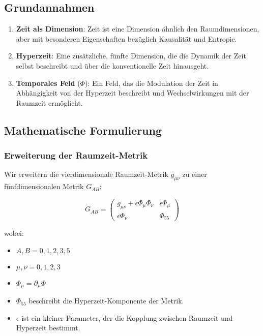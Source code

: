 \documentclass[11pt,a4paper]{article}
\begin{document}
\subsection{Grundannahmen}

\begin{enumerate}
    \item \textbf{Zeit als Dimension}: Zeit ist eine Dimension ähnlich den Raumdimensionen, aber mit besonderen Eigenschaften bezüglich Kausalität und Entropie.
    \item \textbf{Hyperzeit}: Eine zusätzliche, fünfte Dimension, die die Dynamik der Zeit selbst beschreibt und über die konventionelle Zeit hinausgeht.
    \item \textbf{Temporales Feld} ($\Phi$): Ein Feld, das die Modulation der Zeit in Abhängigkeit von der Hyperzeit beschreibt und Wechselwirkungen mit der Raumzeit ermöglicht.
\end{enumerate}

\subsection{Mathematische Formulierung}

\subsubsection{Erweiterung der Raumzeit-Metrik}

Wir erweitern die vierdimensionale Raumzeit-Metrik $g_{\mu\nu}$ zu einer fünfdimensionalen Metrik $G_{AB}$:

\begin{equation}
G_{AB} =
\begin{pmatrix}
g_{\mu\nu} + \epsilon \Phi_\mu \Phi_\nu & \epsilon \Phi_\mu \\
\epsilon \Phi_\nu & \Phi_{55}
\end{pmatrix}
\end{equation}

wobei:

\begin{itemize}
    \item $A, B = 0,1,2,3,5$
    \item $\mu, \nu = 0,1,2,3$
    \item $\Phi_\mu = \partial_\mu \Phi$
    \item $\Phi_{55}$ beschreibt die Hyperzeit-Komponente der Metrik.
    \item $\epsilon$ ist ein kleiner Parameter, der die Kopplung zwischen Raumzeit und Hyperzeit bestimmt.
\end{itemize}
\end{document}

